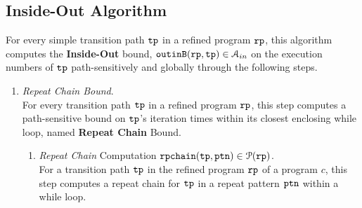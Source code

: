 \subsection{Inside-Out Algorithm}
\label{sec:pathsensitive_rb-inoutalg}
For every simple transition path $\mathtt{tp}$ in a refined program $\mathtt{rp}$, 
this algorithm
computes the \textbf{Inside-Out} bound, $\mathtt{outinB}(\mathtt{rp}, \mathtt{tp}) \in \mathcal{A}_{in}$
on the execution numbers of $\mathtt{tp}$ path-sensitively and globally
through the following steps.

%
\begin{enumerate}
  \item \emph{Repeat Chain Bound}.
  \\
  For every transition path $\mathtt{tp}$ in a refined program $\mathtt{rp}$,
  this step computes a path-sensitive
  bound on $\mathtt{tp}$'s iteration times within its closest enclosing while loop, named \textbf{Repeat Chain} Bound.
  \begin{enumerate}
\item \emph{Repeat Chain} Computation $\mathtt{rpchain}(\mathtt{tp}, \mathtt{ptn}) \in \mathcal{P}(\mathtt{rp})$.
\\
For a transition path $\mathtt{tp}$ in the refined program $\mathtt{rp}$ of a program $c$, 
this step computes a repeat chain for $\mathtt{tp}$ in a repeat pattern $\mathtt{ptn}$
within a while loop.

\end{enumerate}
\end{enumerate}
